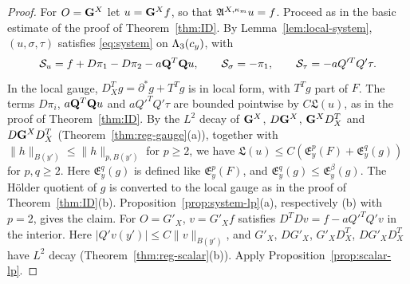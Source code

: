 \begin{proof}
For $O=\mathbf G^X$ let $u=\mathbf G^Xf$, so that $\mathfrak A^{X,\kappa_m}u=f$. Proceed as in the basic estimate of the proof of Theorem~\ref{thm:ID}. By Lemma~\ref{lem:local-system}, $(u,\sigma,\tau)$ satisfies \eqref{eq:system} on $\Lambda_3(c_y)$, with
\[
\mathcal S_u=f+D\pi_1-D\pi_2-a\mathbf Q^T\mathbf Q u,\qquad\mathcal S_\sigma=-\pi_1,\qquad\mathcal S_\tau=-aQ'^TQ'\tau .
\]
In the local gauge, $D^T_Xg=\partial^*g+T^Tg$ is in local form, with $T^Tg$ part of $F$. The terms $D\pi_i$, $a\mathbf Q^T\mathbf Q u$ and $aQ'^TQ'\tau$ are bounded pointwise by $C\mathfrak L(u)$, as in the proof of Theorem~\ref{thm:ID}. By the $L^2$ decay of $\mathbf G^X$, $D\mathbf G^X$, $\mathbf G^XD^T_X$ and $D\mathbf G^XD^T_X$ (Theorem~\ref{thm:reg-gauge}(a)), together with $\|h\|_{B(y')}\le\|h\|_{p,B(y')}$ for $p\ge2$, we have $\mathfrak L(u)\le C(\mathfrak E^p_y(F)+\mathfrak E^q_y(g))$ for $p,q\ge2$. Here $\mathfrak E^q_y(g)$ is defined like $\mathfrak E^p_y(F)$, and $\mathfrak E^q_y(g)\le\mathfrak E^\beta_y(g)$. The H\"older quotient of $g$ is converted to the local gauge as in the proof of Theorem~\ref{thm:ID}(b). Proposition~\ref{prop:system-lp}(a), respectively (b) with $p=2$, gives the claim. For $O=G'_X$, $v=G'_Xf$ satisfies $D^TDv=f-aQ'^TQ'v$ in the interior. Here $|Q'v(y')|\le C\|v\|_{B(y')}$, and $G'_X$, $DG'_X$, $G'_XD^T_X$, $DG'_XD^T_X$ have $L^2$ decay (Theorem~\ref{thm:reg-scalar}(b)). Apply Proposition~\ref{prop:scalar-lp}.
\end{proof}


